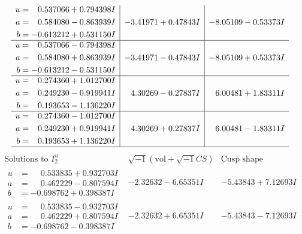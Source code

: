 \documentclass[1p]{elsarticle_modified}
\theoremstyle{definition}
\newcommand{\I}{\sqrt{-1}}
\begin{document}
$$\begin{array}{c|c|c}
\begin{aligned}
u &= \phantom{-}0.537066 + 0.794398 I \\
a &= \phantom{-}0.584080 - 0.863939 I \\
b &= -0.613212 + 0.531150 I\end{aligned}
 & -3.41971 + 0.47843 I & -8.05109 - 0.53373 I \\ \hline\begin{aligned}
u &= \phantom{-}0.537066 - 0.794398 I \\
a &= \phantom{-}0.584080 + 0.863939 I \\
b &= -0.613212 - 0.531150 I\end{aligned}
 & -3.41971 - 0.47843 I & -8.05109 + 0.53373 I \\ \hline\begin{aligned}
u &= \phantom{-}0.274360 + 1.012700 I \\
a &= \phantom{-}0.249230 - 0.919941 I \\
b &= \phantom{-}0.193653 - 1.136220 I\end{aligned}
 & \phantom{-}4.30269 - 0.27837 I & \phantom{-}6.00481 + 1.83311 I \\ \hline\begin{aligned}
u &= \phantom{-}0.274360 - 1.012700 I \\
a &= \phantom{-}0.249230 + 0.919941 I \\
b &= \phantom{-}0.193653 + 1.136220 I\end{aligned}
 & \phantom{-}4.30269 + 0.27837 I & \phantom{-}6.00481 - 1.83311 I\\
 \hline 
 \end{array}$$\newpage$$\begin{array}{c|c|c}  
\text{Solutions to }I^u_{2}& \I (\text{vol} + \sqrt{-1}CS) & \text{Cusp shape}\\
 \hline 
\begin{aligned}
u &= \phantom{-}0.533835 + 0.932703 I \\
a &= \phantom{-}0.462229 - 0.807594 I \\
b &= -0.698762 + 0.398387 I\end{aligned}
 & -2.32632 - 6.65351 I & -5.43843 + 7.12693 I \\ \hline\begin{aligned}
u &= \phantom{-}0.533835 - 0.932703 I \\
a &= \phantom{-}0.462229 + 0.807594 I \\
b &= -0.698762 - 0.398387 I\end{aligned}
 & -2.32632 + 6.65351 I & -5.43843 - 7.12693 I \\ \hline\begin{aligned}

\end{aligned}
\end{array}$$
\end{document}
